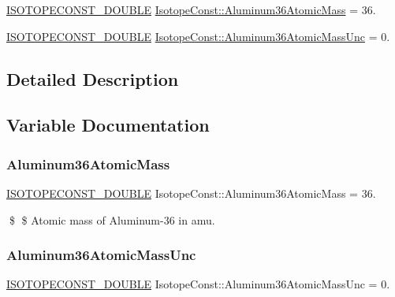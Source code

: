 \begin{DoxyCompactItemize}
\item 
\mbox{\hyperlink{group___isotope_const-_macros_ga8f45a7272ce02c0b4c65c44636ed719a}{I\+S\+O\+T\+O\+P\+E\+C\+O\+N\+S\+T\+\_\+\+D\+O\+U\+B\+LE}} \mbox{\hyperlink{group___isotope_const-_aluminum-_al36_ga29421d053fa98c991237b95ef3076552}{Isotope\+Const\+::\+Aluminum36\+Atomic\+Mass}} = 36.
\item 
\mbox{\hyperlink{group___isotope_const-_macros_ga8f45a7272ce02c0b4c65c44636ed719a}{I\+S\+O\+T\+O\+P\+E\+C\+O\+N\+S\+T\+\_\+\+D\+O\+U\+B\+LE}} \mbox{\hyperlink{group___isotope_const-_aluminum-_al36_gaac2e30761cbbef33e42b8d0a6f8e1118}{Isotope\+Const\+::\+Aluminum36\+Atomic\+Mass\+Unc}} = 0.
\end{DoxyCompactItemize}


\subsection{Detailed Description}


\subsection{Variable Documentation}
\mbox{\label{group___isotope_const-_aluminum-_al36_ga29421d053fa98c991237b95ef3076552}} 
\subsubsection{\texorpdfstring{Aluminum36\+Atomic\+Mass}{Aluminum36AtomicMass}}
{\footnotesize\ttfamily \mbox{\hyperlink{group___isotope_const-_macros_ga8f45a7272ce02c0b4c65c44636ed719a}{I\+S\+O\+T\+O\+P\+E\+C\+O\+N\+S\+T\+\_\+\+D\+O\+U\+B\+LE}} Isotope\+Const\+::\+Aluminum36\+Atomic\+Mass = 36.}

\$ \$ Atomic mass of Aluminum-\/36 in amu. \mbox{\label{group___isotope_const-_aluminum-_al36_gaac2e30761cbbef33e42b8d0a6f8e1118}} 
\subsubsection{\texorpdfstring{Aluminum36\+Atomic\+Mass\+Unc}{Aluminum36AtomicMassUnc}}
{\footnotesize\ttfamily \mbox{\hyperlink{group___isotope_const-_macros_ga8f45a7272ce02c0b4c65c44636ed719a}{I\+S\+O\+T\+O\+P\+E\+C\+O\+N\+S\+T\+\_\+\+D\+O\+U\+B\+LE}} Isotope\+Const\+::\+Aluminum36\+Atomic\+Mass\+Unc = 0.}

